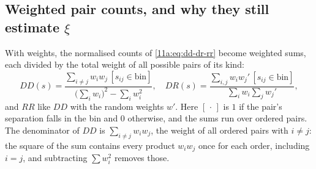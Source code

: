 \subsection{Weighted pair counts, and why they still estimate \texorpdfstring{$\xi$}{xi}}
\label{13c:sec:weighted-counts}

With weights, the normalised counts of \cref{11a:eq:dd-dr-rr} become weighted sums,
each divided by the total weight of all possible pairs of its kind:
\begin{equation}
  DD(s)=\frac{\sum_{i\neq j}w_iw_j\,[s_{ij}\in\text{bin}]}{\bigl(\sum_iw_i\bigr)^2-\sum_iw_i^2},
  \quad
  DR(s)=\frac{\sum_{i,j}w_iw_j'\,[s_{ij}\in\text{bin}]}{\sum_iw_i\sum_jw_j'},
  \label{13c:eq:weighted-counts}
\end{equation}
and $RR$ like $DD$ with the random weights $w'$. Here $[\,\cdot\,]$ is $1$ if the pair's
separation falls in the bin and $0$ otherwise, and the sums run over ordered pairs.
The denominator of $DD$ is $\sum_{i\ne j}w_iw_j$, the weight of all ordered pairs
with $i\ne j$: the square of the sum contains every product $w_iw_j$ once for each
order, including $i=j$, and subtracting $\sum w_i^2$ removes those.

